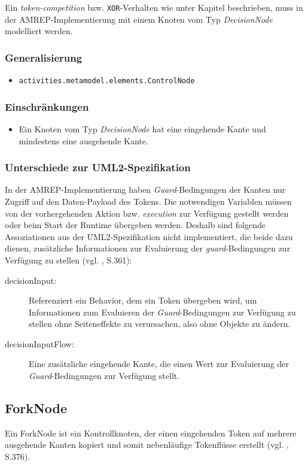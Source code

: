 Ein \emph{token-competition} bzw. \texttt{XOR}-Verhalten wie unter Kapitel  beschrieben, muss in der AMREP-Implementierung mit einem Knoten vom Typ \emph{DecisionNode} modelliert werden.

\subsubsection{Generalisierung}
\begin{itemize}
\item \texttt{activities.metamodel.elements.ControlNode}
\end{itemize}

\subsubsection{Einschränkungen}
\begin{itemize}
\item Ein Knoten vom Typ \emph{DecisionNode} hat eine eingehende Kante und mindestens eine ausgehende Kante.
\end{itemize}

\subsubsection{Unterschiede zur UML2-Spezifikation}
In der AMREP-Implementierung haben \emph{Guard}-Bedingungen der Kanten nur Zugriff auf den Daten-Payload des Tokens.
Die notwendigen Variablen müssen von der vorhergehenden Aktion bzw. \emph{execution} zur Verfügung gestellt werden oder beim Start der Runtime übergeben werden. Deshalb sind folgende Assoziationen aus der UML2-Spezifikation nicht implementiert, die beide dazu dienen, zusätzliche Informationen zur Evaluierung der \emph{guard}-Bedingungen zur Verfügung zu stellen (vgl. \citep{OMG2009}, S.361):
\begin{description}
\item[decisionInput:] Referenziert ein Behavior, dem ein Token übergeben wird, um Informationen zum Evaluieren der \emph{Guard}-Bedingungen zur Verfügung zu stellen ohne Seiteneffekte zu verursachen, also ohne Objekte zu ändern.
\item[decisionInputFlow:] Eine zusätzliche eingehende Kante, die einen Wert zur Evaluierung der \emph{Guard}-Bedingungen zur Verfügung stellt.
\end{description}


\subsection{ForkNode}\label{meta-fork}
Ein ForkNode ist ein Kontrollknoten, der einen eingehenden Token auf mehrere ausgehende Kanten kopiert und somit nebenläufige Tokenflüsse erstellt (vgl. \citep{OMG2009}, S.376).

